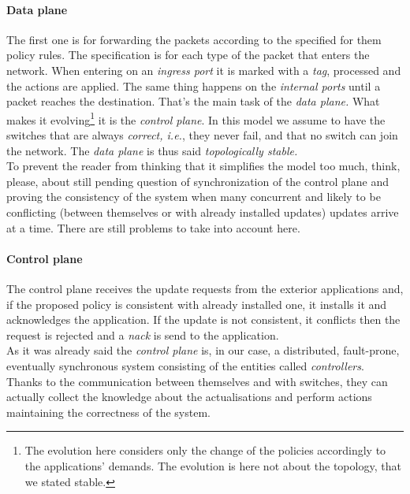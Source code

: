 \documentclass{article}
\theoremstyle{remark}
\begin{document}
\paragraph{Data plane}
The first one is for forwarding the packets according to the specified for them policy rules. The specification is for each type of the packet that enters the network. When entering on an \emph{ingress port} it is marked with a \emph{tag}, processed and the actions are applied. The same thing happens on the \emph{internal ports} until a packet reaches the destination. That's the main task of the \emph{data plane.} What makes it evolving\footnote{The evolution here considers only the change of the policies accordingly to the applications' demands. The evolution is here not about the topology, that we stated stable.} it is the \emph{control plane}. In this model we assume to have the switches that are always \emph{correct, i.e.}, they never fail, and that no switch can join the network. The \emph{data plane} is thus said \emph{topologically stable.}\\
To prevent the reader from thinking that it simplifies the model too much, think, please, about still pending question of synchronization of the control plane and proving the consistency of the system when many concurrent and likely to be conflicting (between themselves or with already installed updates) updates arrive at a time. There are still problems to take into account here.\\
\paragraph{Control plane} 
The control plane receives the update requests from the exterior applications and, if the proposed policy is consistent with already installed one, it installs it and acknowledges the application. If the update is not consistent, it conflicts then the request is rejected and a \emph{nack} is send to the application. \\
As it was already said the \emph{control plane} is, in our case, a distributed, fault-prone, eventually synchronous system consisting of the entities called \emph{controllers}. Thanks to the communication between themselves and with switches, they can actually collect the knowledge about the actualisations and perform actions maintaining the correctness of the system. 
\end{document}
